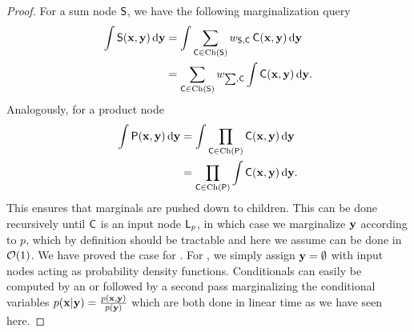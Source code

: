 \linevi*
\begin{proof}
  \label{proof:linevi}
  For a sum node $\Sum$, we have the following marginalization query
  \begin{align*}
    \int\Sum(\set{x},\set{y})\dif\set{y}&=\int\sum_{\Child\in\Ch(\Sum)}w_{\Sum,\Child}\Child(\set{x},\set{y})\dif\set{y}\\
                                        &=\sum_{\Child\in\Ch(\Sum)}w_{\sum,\Child}\int\Child(\set{x},\set{y})\dif\set{y}.
  \end{align*}
  Analogously, for a product node
  \begin{align*}
    \int\Prod(\set{x},\set{y})\dif\set{y}&=\int\prod_{\Child\in\Ch(\Prod)}\Child(\set{x},\set{y})\dif\set{y}\\
                                         &=\prod_{\Child\in\Ch(\Prod)}\int\Child(\set{x},\set{y})\dif\set{y}.
  \end{align*}
  This ensures that marginals are pushed down to children. This can be done recursively until
  $\Child$ is an input node $\Leaf_p$, in which case we marginalize $\set{y}$ according to $p$,
  which by definition should be tractable and here we assume can be done in $\bigo(1)$. We have
  proved the case for \mar{}. For \evi{}, we simply assign $\set{y}=\emptyset$ with input nodes
  acting as probability density functions. Conditionals can easily be computed by an \evi{} or
  \mar{} followed by a second pass marginalizing the conditional variables
  $p(\set{x}|\set{y})=\frac{p(\set{x},\set{y})}{p(\set{y})}$ which are both done in linear time as
  we have seen here.
\end{proof}


